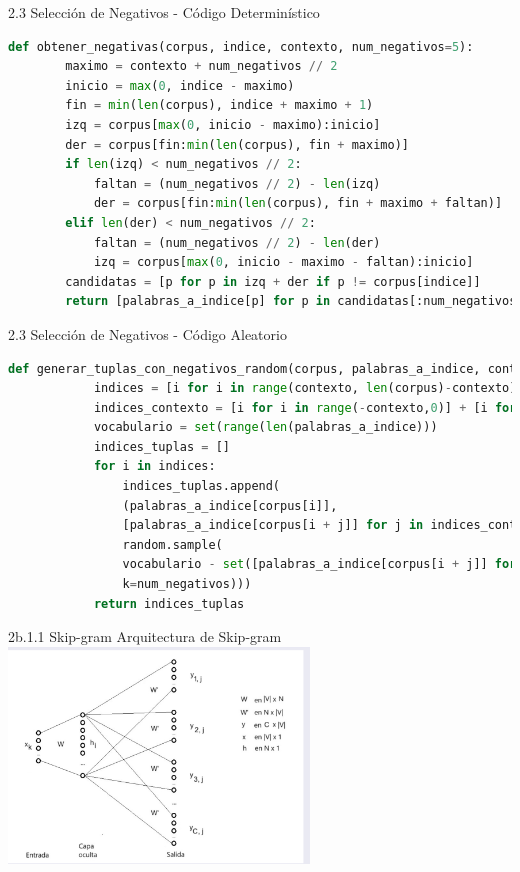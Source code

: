 \documentclass{beamer}
\begin{document}
\begin{frame}[fragile]{2.3 Selección de Negativos - Código Determinístico}
	\begin{block}{}
		\begin{lstlisting}[language=Python]
def obtener_negativas(corpus, indice, contexto, num_negativos=5):
		maximo = contexto + num_negativos // 2
		inicio = max(0, indice - maximo)
		fin = min(len(corpus), indice + maximo + 1)
		izq = corpus[max(0, inicio - maximo):inicio]
		der = corpus[fin:min(len(corpus), fin + maximo)]
		if len(izq) < num_negativos // 2:
			faltan = (num_negativos // 2) - len(izq)
			der = corpus[fin:min(len(corpus), fin + maximo + faltan)]
		elif len(der) < num_negativos // 2:
			faltan = (num_negativos // 2) - len(der)
			izq = corpus[max(0, inicio - maximo - faltan):inicio]
		candidatas = [p for p in izq + der if p != corpus[indice]]
		return [palabras_a_indice[p] for p in candidatas[:num_negativos]]
		\end{lstlisting}
	\end{block}
\end{frame}

\begin{frame}[fragile]{2.3 Selección de Negativos - Código Aleatorio}
	\begin{block}{}
		\begin{lstlisting}[language=Python]
def generar_tuplas_con_negativos_random(corpus, palabras_a_indice, contexto, num_negativos):
			indices = [i for i in range(contexto, len(corpus)-contexto)]
			indices_contexto = [i for i in range(-contexto,0)] + [i for i in range(1,contexto+1)]
			vocabulario = set(range(len(palabras_a_indice)))
			indices_tuplas = []
			for i in indices:
				indices_tuplas.append(
				(palabras_a_indice[corpus[i]],
				[palabras_a_indice[corpus[i + j]] for j in indices_contexto],
				random.sample(
				vocabulario - set([palabras_a_indice[corpus[i + j]] for j in indices_contexto]),
				k=num_negativos)))
			return indices_tuplas
		\end{lstlisting}
	\end{block}
\end{frame}

\begin{frame}[fragile]{2b.1.1 Skip-gram}
	\centering
	\Large Arquitectura de Skip-gram
	\vspace{0.5cm} 
	\vfill
	\includegraphics[width=0.6\textwidth]{Skip_arq.png}
	\vfill
\end{frame}
\end{document}
